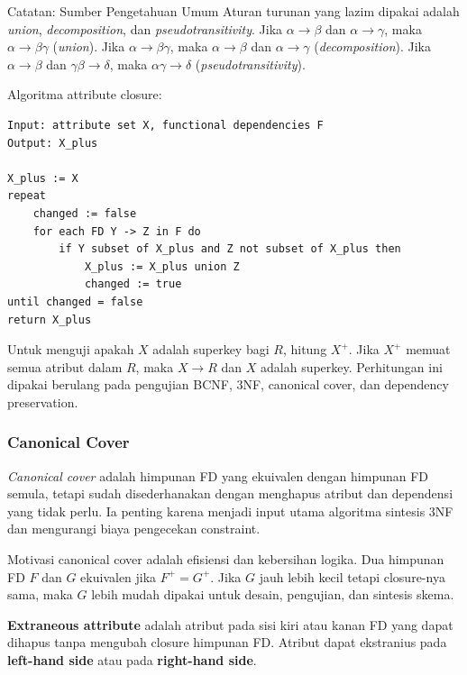 \begin{cmt}{Catatan: Sumber Pengetahuan Umum}{}
Aturan turunan yang lazim dipakai adalah \textit{union}, \textit{decomposition}, dan \textit{pseudotransitivity}. Jika \(\alpha \rightarrow \beta\) dan \(\alpha \rightarrow \gamma\), maka \(\alpha \rightarrow \beta\gamma\) (\textit{union}). Jika \(\alpha \rightarrow \beta\gamma\), maka \(\alpha \rightarrow \beta\) dan \(\alpha \rightarrow \gamma\) (\textit{decomposition}). Jika \(\alpha \rightarrow \beta\) dan \(\gamma\beta \rightarrow \delta\), maka \(\alpha\gamma \rightarrow \delta\) (\textit{pseudotransitivity}).
\end{cmt}

Algoritma attribute closure:
\begin{lstlisting}[caption={Pseudocode attribute closure \(X^+\)}, label={lst:attribute-closure}]
Input: attribute set X, functional dependencies F
Output: X_plus

X_plus := X
repeat
    changed := false
    for each FD Y -> Z in F do
        if Y subset of X_plus and Z not subset of X_plus then
            X_plus := X_plus union Z
            changed := true
until changed = false
return X_plus
\end{lstlisting}

Untuk menguji apakah \(X\) adalah superkey bagi \(R\), hitung \(X^+\). Jika \(X^+\) memuat semua atribut dalam \(R\), maka \(X \rightarrow R\) dan \(X\) adalah superkey. Perhitungan ini dipakai berulang pada pengujian BCNF, 3NF, canonical cover, dan dependency preservation.

\subsubsection{Canonical Cover}

\begin{jawab}
\textit{Canonical cover} adalah himpunan FD yang ekuivalen dengan himpunan FD semula, tetapi sudah disederhanakan dengan menghapus atribut dan dependensi yang tidak perlu. Ia penting karena menjadi input utama algoritma sintesis 3NF dan mengurangi biaya pengecekan constraint.
\end{jawab}

Motivasi canonical cover adalah efisiensi dan kebersihan logika. Dua himpunan FD \(F\) dan \(G\) ekuivalen jika \(F^+ = G^+\). Jika \(G\) jauh lebih kecil tetapi closure-nya sama, maka \(G\) lebih mudah dipakai untuk desain, pengujian, dan sintesis skema.

\textbf{Extraneous attribute} adalah atribut pada sisi kiri atau kanan FD yang dapat dihapus tanpa mengubah closure himpunan FD. Atribut dapat ekstranius pada \textbf{left-hand side} atau pada \textbf{right-hand side}.

